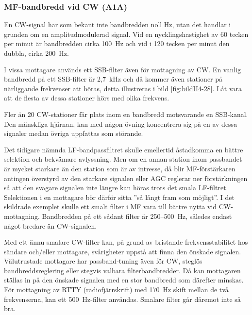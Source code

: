 \subsubsection{MF-bandbredd vid CW (A1A)}

En CW-signal har som bekant inte bandbredden noll Hz, utan det handlar
i grunden om en amplitudmodulerad signal.
Vid en nycklingshastighet av 60 tecken per minut är bandbredden cirka 100~Hz
och vid i 120 tecken per minut den dubbla, cirka 200~Hz.

I vissa mottagare används ett SSB-filter även för mottagning av CW.
En vanlig bandbredd på ett SSB-filter är 2,7~kHz och då kommer även
stationer på närliggande frekvenser att höras, detta illustreras i bild
\ref{fig:bildII4-28}.
Låt vara att de flesta av dessa stationer hörs med olika frekvens.


Fler än 20 CW-stationer får plats inom en bandbredd motsvarande en SSB-kanal.
Den mänskliga hjärnan, kan med någon övning koncentrera sig på en av dessa
signaler medan övriga uppfattas som störande.

Det tidigare nämnda LF-bandpassfiltret skulle emellertid åstadkomma en
bättre selektion och bekvämare avlyssning.
Men om en annan station inom passbandet är mycket starkare än den station
som är av intresse, då blir MF-förstärkaren antingen överstyrd av den
starkare signalen eller AGC reglerar ner förstärkningen så att den svagare
signalen inte längre kan höras trots det smala LF-filtret.
Selektionen i en mottagare bör därför sitta ''så långt fram som möjligt''.
I det skildrade exemplet skulle ett smalt filter i MF vara till bättre nytta
vid CW-mottagning.
Bandbredden på ett sådant filter är 250--500~Hz, således endast något bredare
än CW-signalen.

Med ett ännu smalare CW-filter kan, på grund av bristande frekvensstabilitet hos
sändare och/eller mottagare, svårigheter uppstå att finna den önskade signalen.
Välutrustade mottagare har passband-tuning även för CW, steglös
bandbreddsreglering eller stegvis valbara filterbandbredder.
Då kan mottagaren ställas in på den önskade signalen med en stor bandbredd
som därefter minskas.
För mottagning av RTTY (radiofjärrskrift) med 170~Hz skift mellan de två
frekvenserna, kan ett 500~Hz-filter användas.
Smalare filter går däremot inte så bra.

